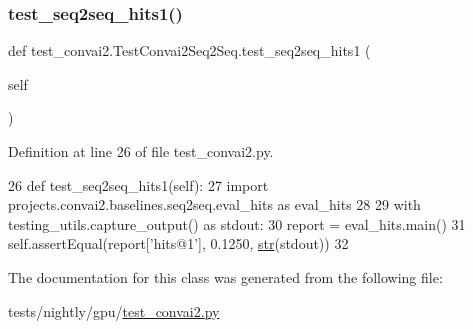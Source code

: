 \subsubsection{\texorpdfstring{test\+\_\+seq2seq\+\_\+hits1()}{test\_seq2seq\_hits1()}}
{\footnotesize\ttfamily def test\+\_\+convai2.\+Test\+Convai2\+Seq2\+Seq.\+test\+\_\+seq2seq\+\_\+hits1 (\begin{DoxyParamCaption}\item[{}]{self }\end{DoxyParamCaption})}



Definition at line 26 of file test\+\_\+convai2.\+py.


\begin{DoxyCode}
26     \textcolor{keyword}{def }test\_seq2seq\_hits1(self):
27         \textcolor{keyword}{import} projects.convai2.baselines.seq2seq.eval\_hits \textcolor{keyword}{as} eval\_hits
28 
29         with testing\_utils.capture\_output() \textcolor{keyword}{as} stdout:
30             report = eval\_hits.main()
31         self.assertEqual(report[\textcolor{stringliteral}{'hits@1'}], 0.1250, \hyperlink{namespacegenerate__task__READMEs_a5b88452ffb87b78c8c85ececebafc09f}{str}(stdout))
32 
\end{DoxyCode}


The documentation for this class was generated from the following file\+:\begin{DoxyCompactItemize}
\item 
tests/nightly/gpu/\hyperlink{test__convai2_8py}{test\+\_\+convai2.\+py}\end{DoxyCompactItemize}
